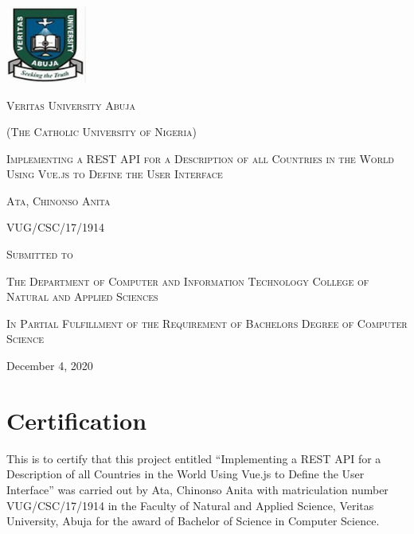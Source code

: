 \documentclass[twoside, a4paper, 12pt]{report}
\begin{document}
\begin{titlepage}
	\centering
	\includegraphics[width=0.2\textwidth]{VeritasUniversityLogo}\par\vspace{1cm}
	{\scshape \LARGE Veritas University Abuja \par}
	{\scshape \Large (The Catholic University of Nigeria) \par}
	\vspace{1cm}
	{\scshape \huge Implementing a REST API for a Description of all Countries in the World Using Vue.js to Define the User Interface \par}
	\vspace{1cm}
	{\scshape \Large Ata, Chinonso Anita \par}
	{\scshape \Large VUG/CSC/17/1914 \par}
	\vspace{0.5cm}
	\scshape Submitted to \par
	\vspace{0.5cm}
	{\scshape \Large The Department of Computer and Information Technology College of Natural and Applied 			Sciences \par}
	\vspace{1cm}
	{\scshape \Large In Partial Fulfillment of the Requirement of Bachelors Degree of Computer Science \par}
	\vfill
	{\Large December 4, 2020 \par}
\end{titlepage}

\newpage
  \thispagestyle{empty}
  \mbox{}
\newpage


\chapter*{Certification}
This is to certify that this project entitled ``Implementing a REST API for a Description of all Countries in the World Using Vue.js to Define the User Interface” was carried out by Ata, Chinonso Anita with matriculation number VUG/CSC/17/1914 in the Faculty of Natural and Applied Science, Veritas University, Abuja for the award of Bachelor of Science in Computer Science.
\end{document}
